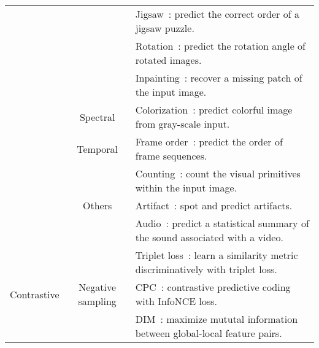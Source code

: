\documentclass[lettersize,journal]{IEEEtran}
\begin{document}
\begin{table*}
\begin{tabular}{|c|c|l|}
                                                  &                                         & Jigsaw~\cite{noroozi2016unsupervised}: predict the correct order of a jigsaw puzzle.                              \\
                                                  &                                         & Rotation~\cite{gidaris2018unsupervised}: predict the rotation angle of rotated images.                            \\
                                                  &                                         & Inpainting~\cite{pathak2016context}: recover a missing patch of the input image.                                  \\ \cline{2-3} 
                                                  & Spectral                                & Colorization~\cite{zhang2016colorful}: predict colorful image from gray-scale input.                              \\ \cline{2-3} 
                                                  & Temporal                                & Frame order~\cite{kim2019self}: predict the order of frame sequences.                                             \\ \cline{2-3} 
                                                  & \multirow{3}{*}{Others}                 & Counting~\cite{noroozi2017representation}: count the visual primitives within the input image.                    \\
                                                  &                                         & Artifact~\cite{jenni2018self}: spot and predict artifacts.                                                        \\
                                                  &                                         & Audio~\cite{owens2016ambient}: predict a statistical summary of the sound associated with a video.                \\ \hline
\multirow{20}{*}{Contrastive}                     & \multirow{8}{*}{Negative sampling}      & Triplet loss~\cite{chopra2005learning}: learn a similarity metric discriminatively with triplet loss.             \\
                                                  &                                         & CPC~\cite{oord2018representation}: contrastive predictive coding with InfoNCE loss.                               \\
                                                  &                                         & DIM~\cite{hjelm2018learning}: maximize mututal information between global-local feature pairs.                    \\

\end{tabular}
\end{table*}
\end{document}
